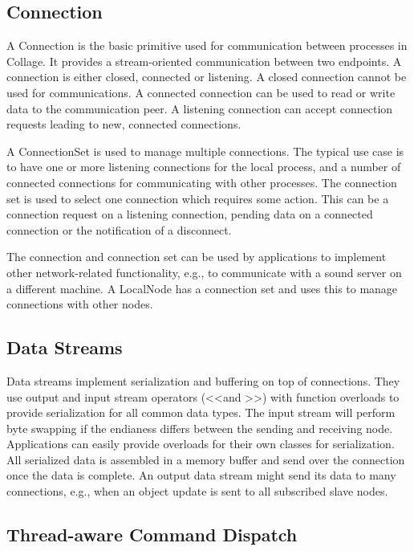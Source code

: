 \subsection{Connection}

A \textsf{Connection} is the basic primitive used for communication between
processes in Collage. It provides a stream-oriented communication between two
endpoints. A connection is either closed, connected or listening. A closed
connection cannot be used for communications. A connected connection can be
used to read or write data to the communication peer. A listening connection
can accept connection requests leading to new, connected connections.

A \textsf{ConnectionSet} is used to manage multiple connections. The typical use
case is to have one or more listening connections for the local process, and a
number of connected connections for communicating with other processes.
The connection set is used to select one connection which requires some action.
This can be a connection request on a listening connection, pending data on a
connected connection or the notification of a disconnect.

The connection and connection set can be used by applications to implement other
network-related functionality, e.g., to communicate with a sound server on a
different machine. A \textsf{LocalNode} has a connection set and uses this to
manage connections with other nodes.

\subsection{Data Streams}

Data streams implement serialization and buffering on top of connections. They
use output and input stream operators (\textless\textless and
\textgreater\textgreater) with function overloads to provide serialization for
all common data types. The input stream will perform byte swapping if the
endianess differs between the sending and receiving node. Applications can
easily provide overloads for their own classes for serialization. All
serialized data is assembled in a memory buffer and send over the connection
once the data is complete. An output data stream might send its data to many
connections, e.g., when an object update is sent to all subscribed slave nodes.

\subsection{Thread-aware Command Dispatch}

